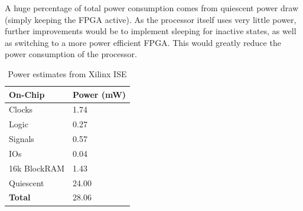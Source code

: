 A huge percentage of total power consumption comes from quiescent power draw (simply keeping the FPGA active).
As the processor itself uses very little power, further improvements would be to implement sleeping for inactive states, as well as switching to a more power efficient FPGA.
This would greatly reduce the power consumption of the processor.

\begin{table}[h]
    \centering
    \begin{tabular}{|l|l|}
        \hline
        \textbf{On-Chip} & \textbf{Power (mW)} \\ \hline
        Clocks           & 1.74                \\ \hline
        Logic            & 0.27                \\ \hline
        Signals          & 0.57                \\ \hline
        IOs              & 0.04                \\ \hline
        16k BlockRAM     & 1.43                \\ \hline
        Quiescent        & 24.00               \\ \hline
        \textbf{Total}   & 28.06               \\ \hline
    \end{tabular}
    \caption{Power estimates from Xilinx ISE}
    \label{tab:power_consumption}
\end{table}
